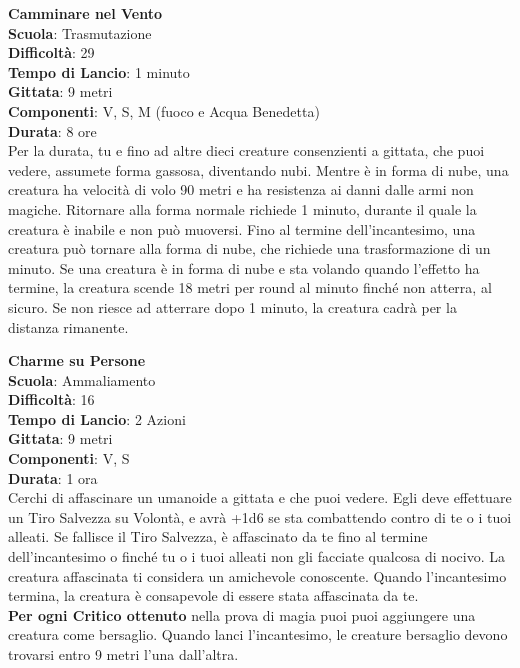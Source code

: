 \begin{multicols}{2}
\medskip\textbf{Camminare nel Vento}\\
\textbf{Scuola}: Trasmutazione\\
\textbf{Difficoltà}: 29\\
\textbf{Tempo di Lancio}: 1 minuto\\
\textbf{Gittata}: 9 metri\\
\textbf{Componenti}: V, S, M (fuoco e Acqua Benedetta)\\
\textbf{Durata}: 8 ore\\
Per la durata, tu e fino ad altre dieci creature consenzienti a gittata, che puoi vedere, assumete forma gassosa, diventando nubi. Mentre è in forma di nube, una creatura ha velocità di volo 90 metri e ha resistenza ai danni dalle armi non magiche. Ritornare alla forma normale richiede 1 minuto, durante il quale la creatura è inabile e non può muoversi. Fino al termine dell'incantesimo, una creatura può tornare alla forma di nube, che richiede una trasformazione di un minuto. Se una creatura è in forma di nube e sta volando quando l'effetto ha termine, la creatura scende 18 metri per round al minuto finché non atterra, al sicuro. Se non riesce ad atterrare dopo 1 minuto, la creatura cadrà per la distanza rimanente.

\medskip\textbf{Charme su Persone}\\
\textbf{Scuola}: Ammaliamento\\
\textbf{Difficoltà}: 16\\
\textbf{Tempo di Lancio}: 2 Azioni\\
\textbf{Gittata}: 9 metri\\
\textbf{Componenti}: V, S\\
\textbf{Durata}: 1 ora\\
Cerchi di affascinare un umanoide a gittata e che puoi vedere. Egli deve effettuare un Tiro Salvezza su Volontà, e avrà +1d6 se sta combattendo contro di te o i tuoi alleati. Se fallisce il Tiro Salvezza, è affascinato da te fino al termine dell'incantesimo o finché tu o i tuoi alleati non gli facciate qualcosa di nocivo. La creatura affascinata ti considera un amichevole conoscente. Quando l'incantesimo termina, la creatura è consapevole di essere stata affascinata da te. \\
\textbf{Per ogni Critico ottenuto} nella prova di magia puoi puoi aggiungere una creatura come bersaglio. Quando lanci l'incantesimo, le creature bersaglio devono trovarsi entro 9 metri l'una dall'altra.


\end{multicols}
